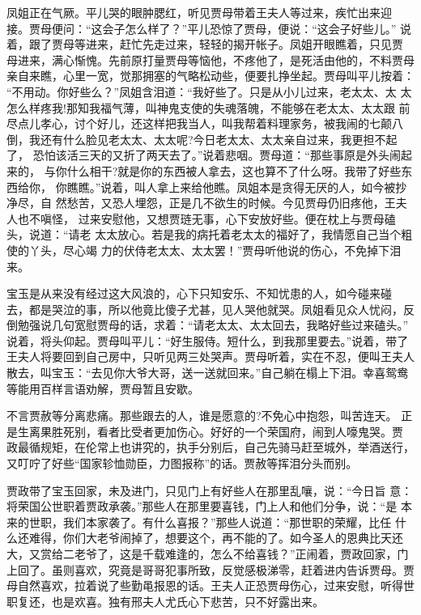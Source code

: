 凤姐正在气厥。平儿哭的眼肿腮红，听见贾母带着王夫人等过来，疾忙出来迎
接。贾母便问：“这会子怎么样了？”平儿恐惊了贾母，便说：“这会子好些儿。”
说着，跟了贾母等进来，赶忙先走过来，轻轻的揭开帐子。凤姐开眼瞧着，只见贾
母进来，满心惭愧。先前原打量贾母等恼他，不疼他了，是死活由他的，不料贾母
亲自来瞧，心里一宽，觉那拥塞的气略松动些，便要扎挣坐起。贾母叫平儿按着：
“不用动。你好些么？”凤姐含泪道：“我好些了。只是从小儿过来，老太太、太
太怎么样疼我!那知我福气薄，叫神鬼支使的失魂落魄，不能够在老太太、太太跟
前尽点儿孝心，讨个好儿，还这样把我当人，叫我帮着料理家务，被我闹的七颠八
倒，我还有什么脸见老太太、太太呢?今日老太太、太太亲自过来，我更担不起了，
恐怕该活三天的又折了两天去了。”说着悲咽。贾母道：“那些事原是外头闹起来的，
与你什么相干?就是你的东西被人拿去，这也算不了什么呀。我带了好些东西给你，
你瞧瞧。”说着，叫人拿上来给他瞧。凤姐本是贪得无厌的人，如今被抄净尽，自
然愁苦，又恐人埋怨，正是几不欲生的时候。今见贾母仍旧疼他，王夫人也不嗔怪，
过来安慰他，又想贾琏无事，心下安放好些。便在枕上与贾母磕头，说道：“请老
太太放心。若是我的病托着老太太的福好了，我情愿自己当个粗使的丫头，尽心竭
力的伏侍老太太、太太罢！”贾母听他说的伤心，不免掉下泪来。

宝玉是从来没有经过这大风浪的，心下只知安乐、不知忧患的人，如今碰来碰
去，都是哭泣的事，所以他竟比傻子尤甚，见人哭他就哭。凤姐看见众人忧闷，反
倒勉强说几句宽慰贾母的话，求着：“请老太太、太太回去，我略好些过来磕头。”
说着，将头仰起。贾母叫平儿：“好生服侍。短什么，到我那里要去。”说着，带了
王夫人将要回到自己房中，只听见两三处哭声。贾母听着，实在不忍，便叫王夫人
散去，叫宝玉：“去见你大爷大哥，送一送就回来。”自己躺在榻上下泪。幸喜鸳鸯
等能用百样言语劝解，贾母暂且安歇。

不言贾赦等分离悲痛。那些跟去的人，谁是愿意的?不免心中抱怨，叫苦连天。
正是生离果胜死别，看者比受者更加伤心。好好的一个荣国府，闹到人嚎鬼哭。贾
政最循规矩，在伦常上也讲究的，执手分别后，自己先骑马赶至城外，举酒送行，
又叮咛了好些“国家轸恤勋臣，力图报称”的话。贾赦等挥泪分头而别。

贾政带了宝玉回家，未及进门，只见门上有好些人在那里乱嚷，说：“今日旨
意：将荣国公世职着贾政承袭。”那些人在那里要喜钱，门上人和他们分争，说：“是
本来的世职，我们本家袭了。有什么喜报？”那些人说道：“那世职的荣耀，比任
什么还难得，你们大老爷闹掉了，想要这个，再不能的了。如今圣人的恩典比天还
大，又赏给二老爷了，这是千载难逢的，怎么不给喜钱？”正闹着，贾政回家，门
上回了。虽则喜欢，究竟是哥哥犯事所致，反觉感极涕零，赶着进内告诉贾母。贾
母自然喜欢，拉着说了些勤黾报恩的话。王夫人正恐贾母伤心，过来安慰，听得世
职复还，也是欢喜。独有邢夫人尤氏心下悲苦，只不好露出来。

